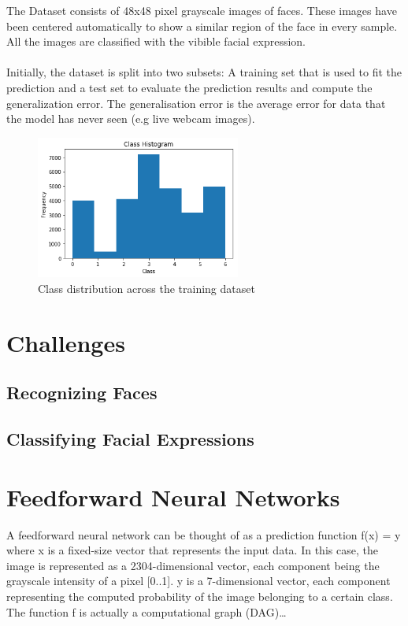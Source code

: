 \documentclass[a4paper,english]{report}
\begin{document}
        The Dataset consists of 48x48 pixel grayscale images of faces. 
        These images have been centered automatically to show a similar 
        region of the face in every sample. All the images are classified
        with the vibible facial expression.
\\\\
Initially, the dataset is split into two subsets: A training set 
        that is used to fit the prediction and a test set to evaluate the prediction results
and compute the generalization error. The generalisation error is the average error for data that the model has never seen (e.g live webcam images).



        \begin{figure}[h]
            \centering
            \includegraphics[width=0.6\textwidth]{figures/class_dist.png}
            \caption{Class distribution across the training dataset}
            \label{fig:classdist}
        \end{figure}
        
        
        \chapter{Challenges}
        \section{Recognizing Faces}
        \section{Classifying Facial Expressions}
        \chapter{Feedforward Neural Networks}
        A feedforward neural network can be thought of as a prediction function f(x) = y where x is a fixed-size vector that represents the input data. In this
        case, the image is represented as a 2304-dimensional vector, each component
        being the grayscale intensity of a pixel [0..1]. y is a 7-dimensional vector,
        each component representing the computed probability of the image belonging 
        to a certain class. The function f is actually a computational graph (DAG)…
        
\end{document}
